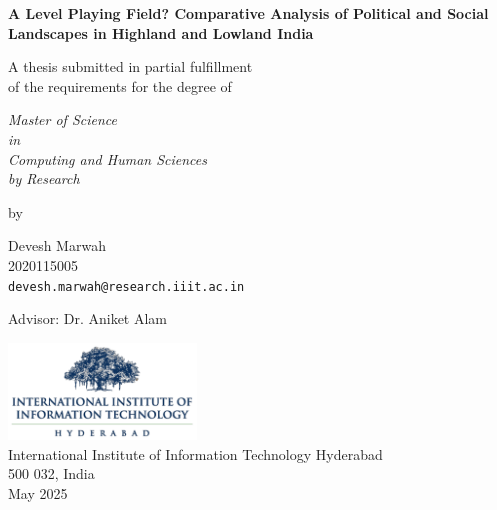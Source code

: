 \thispagestyle{empty}
\begin{center}
\vspace*{1.5cm}
{\Large \bf A Level Playing Field? Comparative Analysis of Political and Social Landscapes in Highland and Lowland India}

\vspace*{2.2cm}
{\large A thesis submitted in partial fulfillment\\}
{\large  of the requirements for the degree of \\}

\vspace*{1cm}
{\it {\large Master of Science } \\
{\large in\\}
{\large Computing and Human Sciences \\}
{\large by Research \\}}


\vspace*{0.8cm}
{\large by}

\vspace*{6mm}
{\large Devesh Marwah\\}
{\large 2020115005\\
{\small \tt devesh.marwah@research.iiit.ac.in}}

\vspace*{5mm}
{\large Advisor: Dr. Aniket Alam\\}


\vspace*{2.0cm}
{\includegraphics[width=5cm]{figures/iiit.png}\\}
{\large International Institute of Information Technology Hyderabad\\}
{\large 500 032, India\\}
\vspace*{5mm}
{\large May 2025\\}
\end{center}